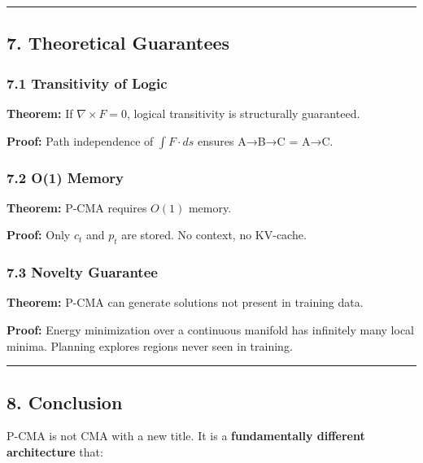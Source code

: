 \documentclass[
  11pt,
  a4paper,
]{article}
\begin{document}
\begin{center}\rule{0.5\linewidth}{0.5pt}\end{center}

\subsection{7. Theoretical Guarantees}\label{theoretical-guarantees}

\subsubsection{7.1 Transitivity of Logic}\label{transitivity-of-logic}

\textbf{Theorem:} If \(\nabla \times F = 0\), logical transitivity is
structurally guaranteed.

\textbf{Proof:} Path independence of \(\int F \cdot ds\) ensures A→B→C =
A→C.

\subsubsection{7.2 O(1) Memory}\label{o1-memory}

\textbf{Theorem:} P-CMA requires \(O(1)\) memory.

\textbf{Proof:} Only \(c_t\) and \(p_t\) are stored. No context, no
KV-cache.

\subsubsection{7.3 Novelty Guarantee}\label{novelty-guarantee}

\textbf{Theorem:} P-CMA can generate solutions not present in training
data.

\textbf{Proof:} Energy minimization over a continuous manifold has
infinitely many local minima. Planning explores regions never seen in
training.

\begin{center}\rule{0.5\linewidth}{0.5pt}\end{center}

\subsection{8. Conclusion}\label{conclusion}

P-CMA is not CMA with a new title. It is a \textbf{fundamentally
different architecture} that:
\end{document}

